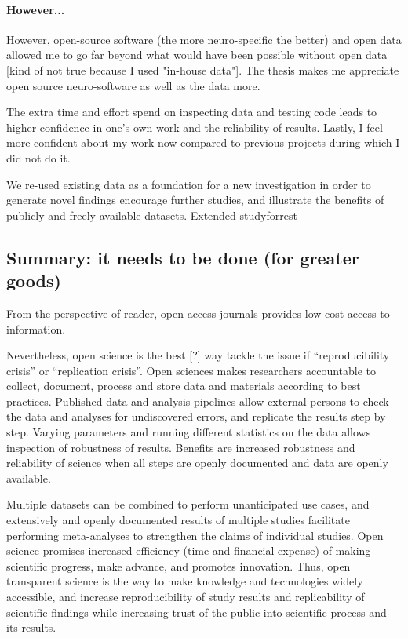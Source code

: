\paragraph{However...}

%
However, open-source software (the more neuro-specific the better) and open data
allowed me to go far beyond what would have been possible without open
data [kind of not true because I used "in-house data"].
%
The thesis makes me appreciate open source neuro-software as well as the data
more.

%
The extra time and effort spend on inspecting data and testing code
leads to higher confidence in one's own work and the reliability of results.
%
Lastly, I feel more confident about my work now compared to previous projects
during which I did not do it.

%
We re-used existing data as a foundation for a new investigation in
order to generate novel findings encourage further studies, and illustrate the
benefits of publicly and freely available datasets.
%
Extended studyforrest
%


\subsection{Summary: it needs to be done (for greater goods)}

%
From the perspective of reader, open access journals provides low-cost access to
information.

%
Nevertheless, open science is the best [?] way tackle the issue if
``reproducibility crisis'' or ``replication crisis''.
%
Open sciences makes researchers accountable to collect, document, process and
store data and materials according to best practices.
%
Published data and analysis pipelines allow external persons to check the data
and analyses for undiscovered errors, and replicate the results step by step.
%
Varying parameters and running different statistics on the data allows
inspection of robustness of results.
%
Benefits are increased robustness and reliability of science when all steps are
openly documented and data are openly available.

%
Multiple datasets can be combined to perform unanticipated use cases, and
extensively and openly documented results of multiple studies facilitate
performing meta-analyses to strengthen the claims of individual studies.
%
Open science promises increased efficiency (time and financial expense) of
making scientific progress, make advance, and promotes innovation.
%
Thus, open transparent science is the way to make knowledge and technologies
widely accessible, and increase reproducibility of study results and
replicability of scientific findings while increasing trust of the public into
scientific process and its results.


